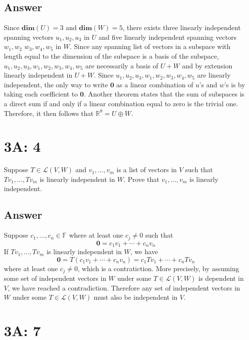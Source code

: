 \documentclass[
	12pt, %
]{fphw}
\newcommand\0{\mathbf{0}}
\newcommand\qed{\text{$\blacksquare$}}
\newcommand\R[1]{\text{$\mathbb{R}^{#1}$}}
\newcommand\F[1]{\text{$\mathbb{F}^{#1}$}}
\newcommand\ls[2]{\text{$#1_1, \ldots, #1_{#2}$}}
\renewcommand\dim[1]{\mathbf{dim}(#1)}
\newcommand\lc[3]{#1_1 #2_1 + \cdots + #1_{#3} #2_{#3}}
\renewcommand\L[2]{\mathcal{L}(#1, #2)}
\begin{document}
\subsection*{Answer} 
Since $\dim{U} = 3$ and $\dim W = 5$, there exists three linearly independent spanning vectors $u_1, u_2, u_3$ in $U$ and five linearly independent spanning vectors $w_1,w_2$ $w_3,w_4,w_5$ in $W$. Since any spanning list of vectors in a subspace with length equal to the dimension of the subspace is a basis of the subspace, $u_1, u_2, u_3,w_1,w_2,w_3,w_4,w_5$ are necessarily a basis of $U + W$ and by extension linearly independent in $U + W$. Since $u_1, u_2, u_3,w_1,w_2,w_3,w_4,w_5$ are linearly independent, the only way to write $\0$ as a linear combination of $u$'s and $w$'s is by taking each coefficient to $\0$. Another theorem states that the sum of subspaces is a direct sum if and only if a linear combination equal to zero is the trivial one. Therefore, it then follows that $\R{8} = U \oplus W$.


\section*{3A: 4}

\begin{problem}
Suppose $T \in \L V W$ and $\ls vm$ is a list of vectors in $V$ such that $\ls{Tv}m$ is linearly independent in $W$. Prove that $\ls vm$ is linearly independent.
\end{problem}

\subsection*{Answer}
Suppose $\ls cn \in \F{}$ where at least one $c_j \ne 0$ such that
$$
\0 = \lc cvn
$$
If $\ls{Tv}m$ is linearly independent in $W$, we have
$$
\0 = T(\lc c{v}n) = \lc c{Tv}n
$$
where at least one $c_j \ne 0$, which is a contratiction. More precisely, by assuming some set of independent vectors in $W$ under some $T \in \L VW$ is dependent in $V$, we have reached a contradiction. Therefore any set of independent vectors in $W$ under some $T \in \L VW$ must also be independent in $V$. \qed


\section*{3A: 7}
\end{document}

